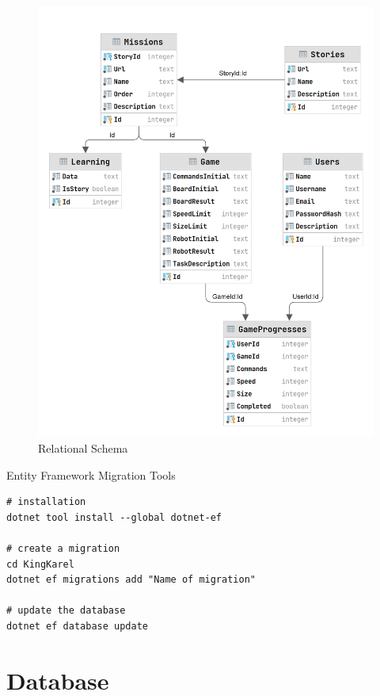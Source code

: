 \begin{figure}
    \centering
    \includegraphics[width=1\linewidth]{assets/implementation/erdiagram.png}
    \caption{Relational Schema}
    \label{fig:impementation:relationalschema}
\end{figure}

\begin{listing}
    \caption{Entity Framework Migration Tools}
    \label{listing:migration}
    \begin{verbatim}
# installation
dotnet tool install --global dotnet-ef

# create a migration
cd KingKarel
dotnet ef migrations add "Name of migration"

# update the database
dotnet ef database update
    \end{verbatim}
\end{listing}

\section{Database}

